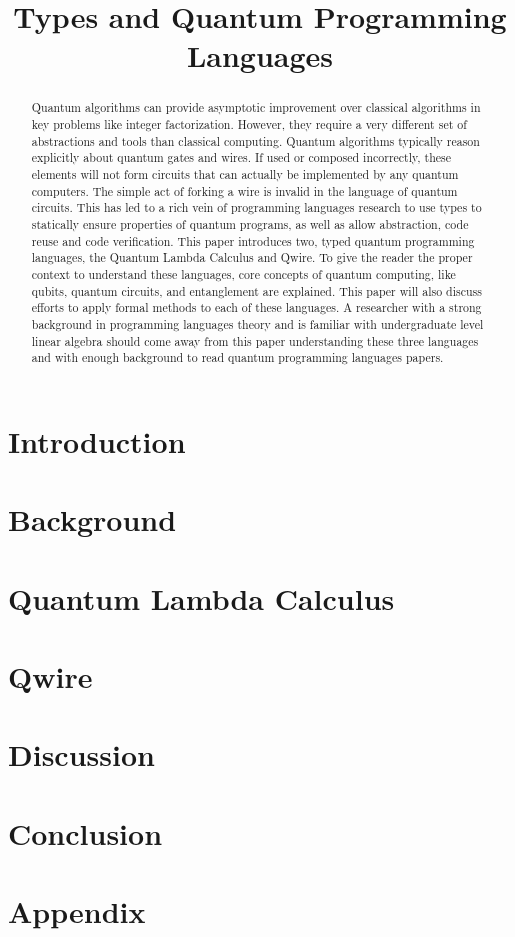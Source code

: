 \documentclass[acmsmall,screen,review]{acmart}
\newif\ifpaper \papertrue
\begin{document}
\title{Types and Quantum Programming Languages}
\begin{abstract}
Quantum algorithms can provide asymptotic improvement over classical algorithms in key problems like integer factorization.
However, they require a very different set of abstractions and tools than classical computing.
Quantum algorithms typically reason explicitly about quantum gates and wires.
If used or composed incorrectly, these elements will not form circuits that can actually be implemented by any quantum computers.
The simple act of forking a wire is invalid in the language of quantum circuits.
This has led to a rich vein of programming languages research to use types to statically ensure properties of quantum programs, as well as allow abstraction, code reuse and code verification.
This paper introduces two, typed quantum programming languages, the Quantum Lambda Calculus and Qwire.
To give the reader the proper context to understand these languages, core concepts of quantum computing, like qubits, quantum circuits, and entanglement are explained.
This paper will also discuss efforts to apply formal methods to each of these languages.
A researcher with a strong background in programming languages theory and is familiar with undergraduate level linear algebra should come away from this paper understanding these three languages and with enough background to read quantum programming languages papers.
\end{abstract}

\maketitle
\ifpaper

\section{Introduction}


\section{Background}
\label{sec:background}


\section{Quantum Lambda Calculus}


\section{Qwire}


\section{Discussion}


\section{Conclusion}


\else

\fi




\section{Appendix}

\end{document}
